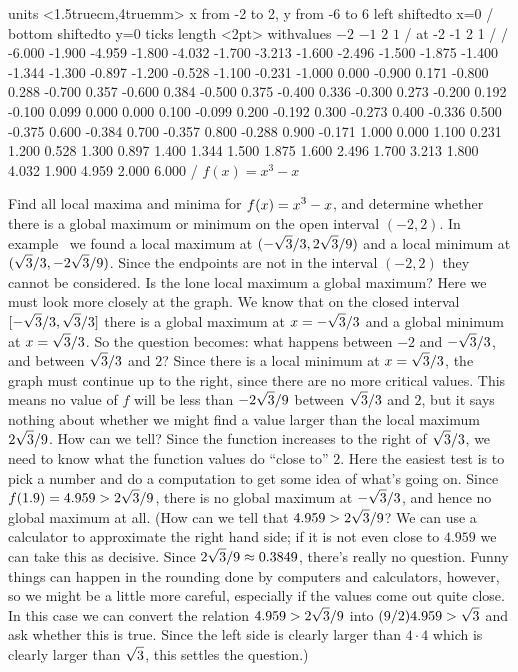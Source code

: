 \figure
\texonly
\vbox{\beginpicture
\normalgraphs
\ninepoint
\setcoordinatesystem units <1.5truecm,4truemm>
\setplotarea x from -2 to 2, y from -6 to 6
\axis left shiftedto x=0 /
\axis bottom shiftedto y=0 ticks length <2pt> withvalues {$-2$} {$-1$} {$2$}
      {$1$} / at -2 -1 2 1 / /
\setquadratic
{} -6.000 -1.900 -4.959 -1.800 -4.032 -1.700 -3.213 -1.600 -2.496 
-1.500 -1.875 -1.400 -1.344 -1.300 -0.897 -1.200 -0.528 -1.100 -0.231 
-1.000 0.000 -0.900 0.171 -0.800 0.288 -0.700 0.357 -0.600 0.384 
-0.500 0.375 -0.400 0.336 -0.300 0.273 -0.200 0.192 -0.100 0.099 
0.000 0.000 0.100 -0.099 0.200 -0.192 0.300 -0.273 0.400 -0.336 
0.500 -0.375 0.600 -0.384 0.700 -0.357 0.800 -0.288 0.900 -0.171 
1.000 0.000 1.100 0.231 1.200 0.528 1.300 0.897 1.400 1.344 
1.500 1.875 1.600 2.496 1.700 3.213 1.800 4.032 1.900 4.959 
2.000 6.000  /
\endpicture}
\endtexonly
{}
\begincaption
$f(x)=x^3-x$
\endcaption
\endfigure

\example
Find all local maxima and minima for $\displaystyle f(x)=x^3-x$, and determine whether
there is a global maximum or minimum on the open interval 
$(-2,2)$. In example~ we found a local maximum at $\displaystyle (-\sqrt3/3,2\sqrt{3}/9)$ and a
local minimum at $\displaystyle (\sqrt3/3,-2\sqrt{3}/9)$. Since the endpoints are
not in the interval $(-2,2)$ they cannot be considered.
Is the lone local maximum
a global maximum? Here we must look more closely at the graph. 
We know that on the closed interval $\displaystyle [-\sqrt3/3,\sqrt3/3]$ there is a
global maximum at $\displaystyle x=-\sqrt3/3$ and a global minimum at $\displaystyle x=\sqrt3/3$.
So the question becomes: what happens between $-2$ and $\displaystyle -\sqrt3/3$, and between
$\displaystyle \sqrt3/3$ and $2$? Since there is a local minimum at $\displaystyle x=\sqrt3/3$,
the graph must continue up to the right, since there are no more
critical values. This means no value of $f$ will be less than 
$\displaystyle -2\sqrt{3}/9$ between $\displaystyle \sqrt3/3$ and $2$, but it says nothing about
whether we might find a value larger than the local maximum
$\displaystyle 2\sqrt{3}/9$.
How can we tell? Since the function increases to the right of
$\displaystyle \sqrt3/3$, we need to know what the function values do ``close to''
$2$. Here the easiest test is to pick a number and do a computation to
get some idea of what's going on. Since $\displaystyle f(1.9)=4.959>2\sqrt{3}/9$,
there is no global maximum at $\displaystyle -\sqrt3/3$, and hence no global maximum
at all. (How can we tell that $\displaystyle 4.959>2\sqrt{3}/9$? We can use a
calculator to approximate the right hand side; if it is not even close
to $4.959$ we can take this as decisive. Since 
$\displaystyle 2\sqrt{3}/9\approx 0.3849$, there's really no question.
Funny things can happen in
the rounding done by computers and calculators, however, so we might
be a little more careful, especially if the values come out quite
close.
In this case we can convert the relation $\displaystyle 4.959>2\sqrt{3}/9$ into 
$\displaystyle (9/2) 4.959>\sqrt{3}$ and ask whether this is true. Since the left side
is clearly larger than $4\cdot 4$ which is clearly larger than
$\displaystyle \sqrt3$, this settles the question.)

